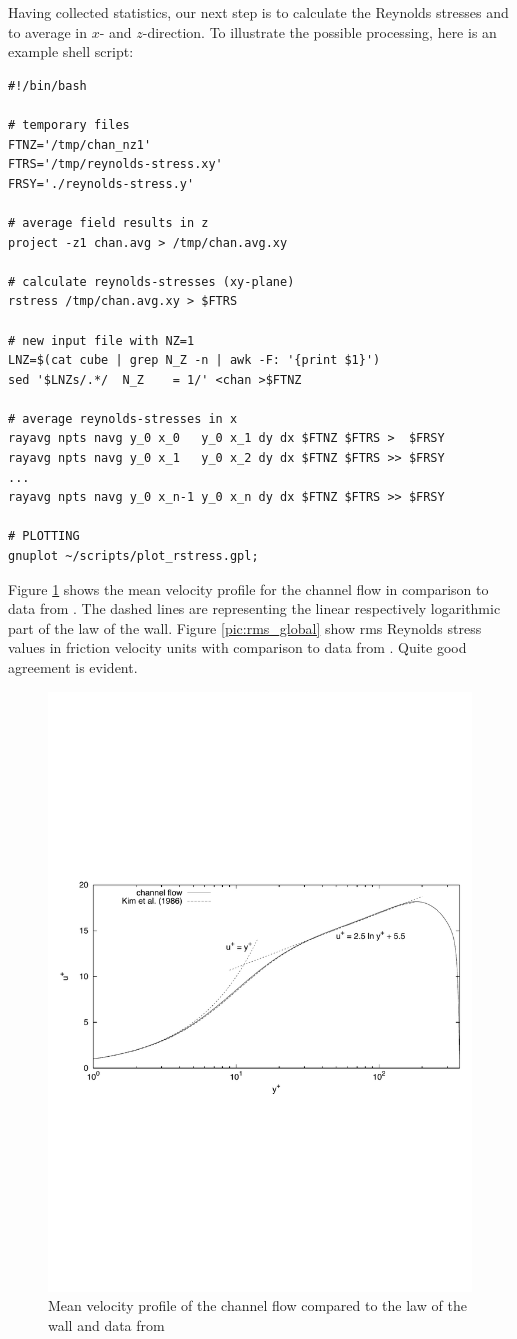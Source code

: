 \documentclass[11pt]{report}
\begin{document}
Having collected statistics, our next step is to calculate the
Reynolds stresses and to average in $x$- and $z$-direction. To
illustrate the possible processing, here is an example shell script:

{\small
\begin{verbatim}
#!/bin/bash

# temporary files
FTNZ='/tmp/chan_nz1'
FTRS='/tmp/reynolds-stress.xy'
FRSY='./reynolds-stress.y'

# average field results in z
project -z1 chan.avg > /tmp/chan.avg.xy

# calculate reynolds-stresses (xy-plane)
rstress /tmp/chan.avg.xy > $FTRS

# new input file with NZ=1
LNZ=$(cat cube | grep N_Z -n | awk -F: '{print $1}')
sed '$LNZs/.*/  N_Z    = 1/' <chan >$FTNZ

# average reynolds-stresses in x
rayavg npts navg y_0 x_0   y_0 x_1 dy dx $FTNZ $FTRS >  $FRSY
rayavg npts navg y_0 x_1   y_0 x_2 dy dx $FTNZ $FTRS >> $FRSY
...
rayavg npts navg y_0 x_n-1 y_0 x_n dy dx $FTNZ $FTRS >> $FRSY

# PLOTTING
gnuplot ~/scripts/plot_rstress.gpl;
\end{verbatim}
}

Figure \ref{pic:u_wall} shows the mean velocity profile for the
channel flow in comparison to data from \citet{kmm87}. The dashed
lines are representing the linear respectively logarithmic part of the
law of the wall.  Figure \ref{pic:rms_global} show rms Reynolds stress
values in friction velocity units with comparison to data from
\citet{kmm87}.  Quite good agreement is evident.

\begin{figure}
\centering
\includegraphics[width=0.7\linewidth]{dns_u_wall}
\caption{Mean velocity profile of the channel flow compared to the law
  of the wall and data from \citet{kmm87}}
\label{pic:u_wall}
\end{figure}
\end{document}
